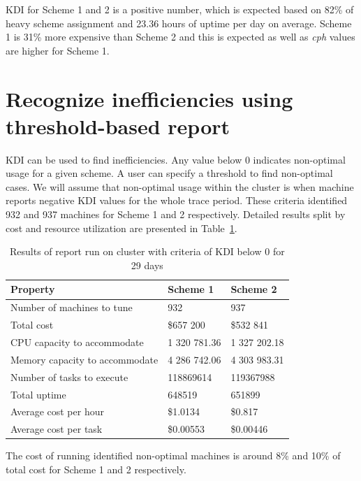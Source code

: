 \documentclass[]{final_report}
\begin{document}
KDI for Scheme 1 and 2 is a positive number, which is expected based on 82\% of heavy scheme assignment and 23.36 hours of uptime per day on average.
Scheme 1 is 31\% more expensive than Scheme 2 and this is expected as well as \textit{cph} values are higher for Scheme 1. 

\section{Recognize inefficiencies using threshold-based report}

KDI can be used to find inefficiencies.  Any value below 0 indicates non-optimal usage for a given scheme. 
A user can specify a threshold to find non-optimal cases. We will assume that non-optimal usage within the cluster is when machine reports negative KDI values for the whole trace period.
 These criteria identified 932 and 937 machines for Scheme 1 and 2 respectively. Detailed results split by cost and resource utilization are presented in Table~\ref{tab:threshold_based_report}.

\begin{table}[h]
\begin{center}
    \begin{tabular}{| l | l | l |}
    \hline
    \textbf{Property} & \textbf{Scheme 1} & \textbf{Scheme 2} \\
    \hline
    Number of machines to tune & 932 & 937 \\
    \hline
    Total cost & \$657 200 & \$532 841 \\
    \hline
    CPU capacity to accommodate & 1 320 781.36 & 1 327 202.18 \\
    \hline
    Memory capacity to accommodate & 4 286 742.06 & 4 303 983.31 \\
    \hline
    Number of tasks to execute & 118869614 & 119367988 \\
    \hline
    Total uptime & 648519 & 651899 \\
    \hline
    Average cost per hour & \$1.0134 & \$0.817 \\
    \hline
    Average cost per task & \$0.00553  & \$0.00446 \\
    \hline
    \end{tabular}
\end{center}
\caption{Results of report run on cluster with criteria of KDI below 0 for 29 days}
\label{tab:threshold_based_report}
\end{table}

The cost of running identified non-optimal machines is around 8\% and 10\% of total cost for Scheme 1 and 2 respectively.  
\end{document}
